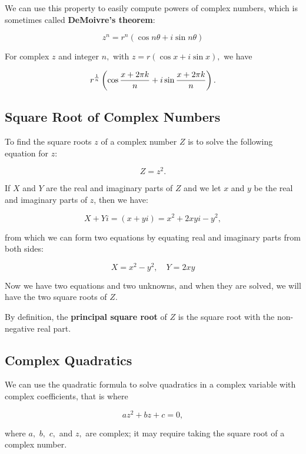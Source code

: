 \documentclass{article}
\begin{document}
We can use this property to easily compute powers of complex numbers, which is sometimes called \textbf{DeMoivre's theorem}:

\begin{theorem}\label{de-moivres-}
\[ z^n = r^n ( \cos{n\theta} + i \sin{n \theta} ) \]
\end{theorem}

\begin{theorem}\label{nth-root-of-z}
For complex $z$ and \@{integer} $n,$ with $z = r(\cos{x} + i \sin{x}),$ we have

\[ r^{\frac{1}{n}} \left(\cos{\frac{x + 2 \pi k}{n}} + i \sin{\frac{x + 2 \pi k}{n}}\right). \]
\end{theorem}

\subsection{Square Root of Complex Numbers}

To find the square roots $z$ of a complex number $Z$ is to solve the following equation for $z$:

\[ Z = z^2. \]

If $X$ and $Y$ are the real and imaginary parts of $Z$ and we let $x$ and $y$ be the real and imaginary parts of $z$, then we have:

\[ X + Yi = (x + yi) = x^2 +2xyi -y^2, \]

from which we can form two equations by equating real and imaginary parts from both sides:

\[ X = x^2 - y^2, \quad Y = 2xy \]

Now we have two equations and two unknowns, and when they are solved, we will have the two square roots of $Z$.

By definition, the \textbf{principal square root} of $Z$ is the square root with the non-negative real part.

\subsection{Complex Quadratics}

We can use the quadratic formula to solve quadratics in a complex variable with complex coefficients, that is where

\[ az^2 +bz +c = 0, \]

where $a,$ $b,$ $c,$ and $z,$ are complex; it may require taking the square root of a complex number.
\end{document}
